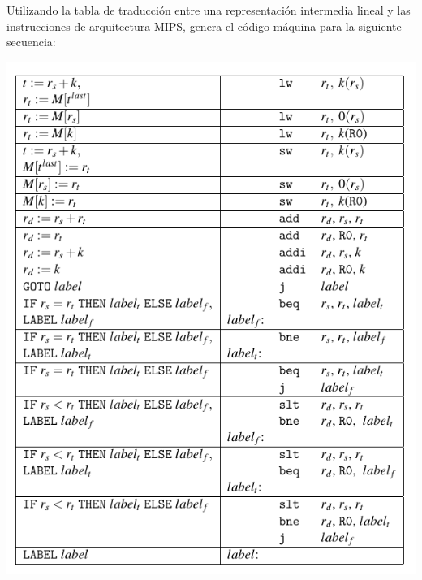 Utilizando la tabla de traducci\'on entre una representaci\'on 
intermedia lineal y las instrucciones de arquitectura MIPS, 
genera el c\'odigo m\'aquina para la siguiente secuencia:


\includegraphics[width=.75\textwidth]{./MIPSInstrSet}
